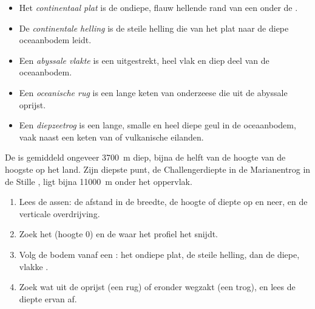 \begin{definition}\label{def:g8:the-oceans:seafloor}
\begin{itemize}
  \item Het \emph{continentaal plat} is de
        ondiepe, flauw hellende rand van een  onder de .
  \item De \emph{continentale helling} is de
        steile helling die van het plat naar de diepe oceaanbodem leidt.
  \item Een \emph{abyssale vlakte} is een
        uitgestrekt, heel vlak en diep deel van de oceaanbodem.
  \item Een \emph{oceanische rug} is een lange keten
        van onderzeese  die uit de abyssale  oprijst.
  \item Een \emph{diepzeetrog} is een lange, smalle en
        heel diepe geul in de oceaanbodem, vaak naast een keten van 
        of vulkanische eilanden.
\end{itemize}
\end{definition}

De  is gemiddeld ongeveer \qty{3700}{m} diep, bijna de helft van de
hoogte van de hoogste  op het land. Zijn diepste punt, de
Challengerdiepte in de Marianentrog in de Stille , ligt bijna
\qty{11000}{m} onder het oppervlak.


\begin{method}
\begin{enumerate}
  \item Lees de assen: de afstand in de breedte, de hoogte of diepte op en
        neer, en de verticale overdrijving.
  \item Zoek het  (hoogte 0) en de  waar het profiel het
        snijdt.
  \item Volg de bodem vanaf een : het ondiepe plat, de steile helling,
        dan de diepe, vlakke .
  \item Zoek wat uit de  oprijst (een rug) of eronder wegzakt (een
        trog), en lees de diepte ervan af.
\end{enumerate}
\end{method}

